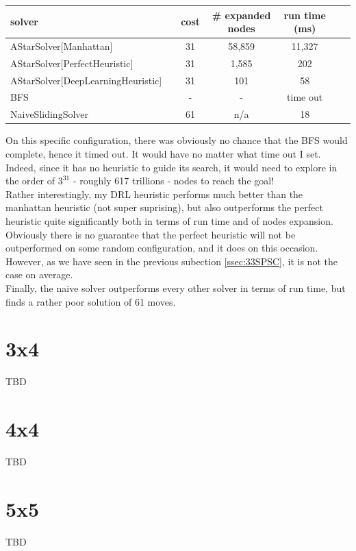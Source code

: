 \begin{center}
\begin{tabular}{l*{5}{c}r}
\hline
\textbf{solver}      & & \textbf{cost} & \textbf{\# expanded nodes} & \textbf{run time (ms)} \\
\hline
AStarSolver[Manhattan]   &   &      31  & 58,859  & 11,327  \\
\hline
AStarSolver[PerfectHeuristic]  &   & 31 & 1,585 & 202 \\
\hline
AStarSolver[DeepLearningHeuristic]  &   & 31 & 101 & 58 \\
\hline
BFS  &   & - & - & time out \\
\hline
NaiveSlidingSolver  &   & 61 & n/a & 18 \\
\hline
\end{tabular}
\end{center}
On this specific configuration, there was obviously no chance that the BFS would complete, hence it timed out. It would have no matter what time out I set. Indeed, since it has no heuristic to guide its search, it would need to explore in the order of $3^{31}$ - roughly 617 trillions - nodes to reach the goal!
\\
Rather interestingly, my DRL heuristic performs much better than the manhattan heuristic (not super suprising), but also outperforms the perfect heuristic quite significantly both in terms of run time and of nodes expansion. Obviously there is no guarantee that the perfect heuristic will not be outperformed on some random configuration, and it does on this occasion. However, as we have seen in the previous subection \ref{ssec:33SPSC}, it is not the case on average.
\\
Finally, the naive solver outperforms every other solver in terms of run time, but finds a rather poor solution of 61 moves.



\section{3x4}

TBD


\section{4x4}

TBD


\section{5x5}

TBD
